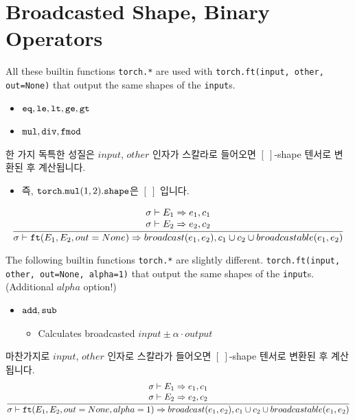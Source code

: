\documentclass{article}
\begin{document}
\section*{Broadcasted Shape, Binary Operators}
All these builtin functions \texttt{torch.*} are used with
\texttt{torch.ft(input, other, out=None)} that output the same shapes of the
\texttt{input}s.
\begin{itemize}
  \item $\mathtt{eq}, \mathtt{le}, \mathtt{lt}, \mathtt{ge}, \mathtt{gt}$
  \item $\mathtt{mul}, \mathtt{div}, \mathtt{fmod}$
\end{itemize}
한 가지 독특한 성질은 $input$, $other$ 인자가 스칼라로 들어오면 $[\:]$-shape
텐서로 변환된 후 계산됩니다.
\begin{itemize}
  \item 즉, $\mathtt{torch.mul}(1, 2)\mathtt{.shape}$은 $[\:]$ 입니다.
\end{itemize}
\begin{align*}
  \frac
  {
    \begin{array}{l}
      \sigma \vdash E_1 \Rightarrow e_1, c_1 \\
      \sigma \vdash E_2 \Rightarrow e_2, c_2 \\
    \end{array}
  }
  {
    \sigma \vdash \mathtt{ft(}E_1, E_2, out=None\mathtt{)} \Rightarrow broadcast(e_1, e_2),
      c_1 \cup c_2 \cup broadcastable(e_1, e_2)
  }
\end{align*}

The following builtin functions \texttt{torch.*} are slightly different.
\texttt{torch.ft(input, other, out=None, alpha=1)} that output the same shapes
of the \texttt{input}s. (Additional $alpha$ option!)
\begin{itemize}
  \item $\mathtt{add}, \mathtt{sub}$
  \begin{itemize}
    \item Calculates broadcasted $input \pm \alpha \cdot output$
  \end{itemize}
\end{itemize}
마찬가지로 $input$, $other$ 인자로 스칼라가 들어오면 $[\:]$-shape 텐서로 변환된
후 계산됩니다.
\begin{align*}
  \frac
  {
    \begin{array}{l}
      \sigma \vdash E_1 \Rightarrow e_1, c_1 \\
      \sigma \vdash E_2 \Rightarrow e_2, c_2 \\
    \end{array}
  }
  {
    \sigma \vdash \mathtt{ft(}E_1, E_2, out=None, alpha=1\mathtt{)} \Rightarrow
      broadcast(e_1, e_2), c_1 \cup c_2 \cup broadcastable(e_1, e_2)
  }
\end{align*}
\end{document}

